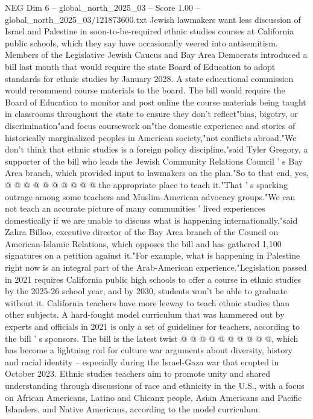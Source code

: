 \begin{textsample}{NEG Dim 6 – global\_north\_2025\_03 – Score 1.00 – global\_north\_2025\_03/121873600.txt}  \label{ex:f6_neg_172}
Jewish lawmakers want less discussion of Israel and Palestine in soon-to-be-required ethnic studies courses at California public schools, which they say have occasionally veered into antisemitism.
Members of the Legislative Jewish Caucus and Bay Area Democrats introduced a bill last month that would require the state Board of Education to adopt standards for ethnic studies by January 2028.
A state educational commission would recommend course materials to the board.
The bill would require the Board of Education to monitor and post online the course materials being taught in classrooms throughout the state to ensure they don't reflect"bias, bigotry, or discrimination"and focus coursework on"the domestic experience and stories of historically marginalized peoples in American society,"not conflicts abroad."We don't think that ethnic studies is a foreign policy discipline,"said Tyler Gregory, a supporter of the bill who leads the Jewish Community Relations Council ' s Bay Area branch, which provided input to lawmakers on the plan."So to that end, yes, @ @ @ @ @ @ @ @ @ @ the appropriate place to teach it."That ' s sparking outrage among some teachers and Muslim-American advocacy groups."We can not teach an accurate picture of many communities ' lived experiences domestically if we are unable to discuss what is happening internationally,"said Zahra Billoo, executive director of the Bay Area branch of the Council on American-Islamic Relations, which opposes the bill and has gathered 1,100 signatures on a petition against it."For example, what is happening in Palestine right now is an integral part of the Arab-American experience."Legislation passed in 2021 requires California public high schools to offer a course in ethnic studies by the 2025-26 school year, and by 2030, students won't be able to graduate without it.
California teachers have more leeway to teach ethnic studies than other subjects.
A hard-fought model curriculum that was hammered out by experts and officials in 2021 is only a set of guidelines for teachers, according to the bill ' s sponsors.
The bill is the latest twist @ @ @ @ @ @ @ @ @ @, which has become a lightning rod for culture war arguments about diversity, history and racial identity -- especially during the Israel-Gaza war that erupted in October 2023.
Ethnic studies teachers aim to promote unity and shared understanding through discussions of race and ethnicity in the U.S., with a focus on African Americans, Latino and Chicanx people, Asian Americans and Pacific Islanders, and Native Americans, according to the model curriculum.

\end{textsample}
